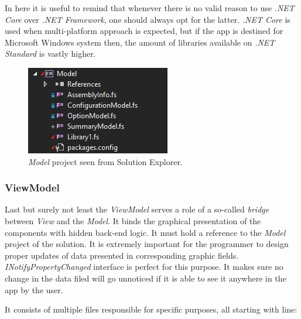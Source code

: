        In here it is useful to remind that whenever there is no valid reason to use \textit{.NET Core} over \textit{.NET Framework}, one should always opt for the latter. \textit{.NET Core} is used when multi-platform approach is expected, but if the app is destined for Microsoft Windows system then, the amount of libraries available on \textit{.NET Standard} is vastly higher.
        
        \begin{figure}[H]
            \centering
            \includegraphics{img/model.png}
            \caption{\textit{Model} project seen from Solution Explorer.}
            \label{fig:model}
        \end{figure} 
        
    \subsubsection{ViewModel}    
        Last but surely not least the \textit{ViewModel} serves a role of a so-called \textit{bridge} between \textit{View} and the \textit{Model}. It binds the graphical presentation of the components with hidden back-end logic. It must hold a reference to the \textit{Model} project of the solution. It is extremely important for the programmer to design proper updates of data presented in corresponding graphic fields. \textit{INotifyPropertyChanged} interface is perfect for this purpose. It makes sure no change in the data filed will go unnoticed if it is able to see it anywhere in the app by the user.
        
        It consists of multiple files responsible for specific purposes, all starting with line:
        
